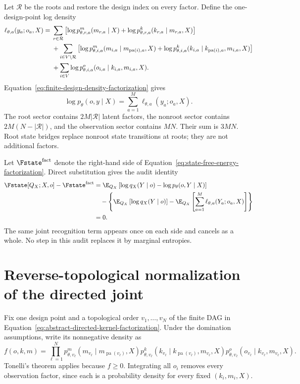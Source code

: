 Let \(\mathcal R\) be the roots and restore the design index on every factor. Define the one-design-point log density
\begin{align}
\ell_{\theta,a}(y_a;o_a,X)
={}&\sum_{r\in\mathcal R}
\left[
\log p_{\theta,r,a}^{m}(m_{r,a}\mid X)
+\log p_{\theta,r,a}^{k}(k_{r,a}\mid m_{r,a},X)
\right]
\label{eq:appendix-one-point-log-factorization}\\
&+\sum_{i\in V\setminus\mathcal R}
\left[
\log p_{\theta,i,a}^{m}
(m_{i,a}\mid m_{\operatorname{pa}(i),a},X)
+\log p_{\theta,i,a}^{k}
(k_{i,a}\mid k_{\operatorname{pa}(i),a},m_{i,a},X)
\right]\notag\\
&+\sum_{i\in V}
\log p_{\theta,i,a}^{o}
(o_{i,a}\mid k_{i,a},m_{i,a},X).\notag
\end{align}
Equation~\eqref{eq:finite-design-density-factorization} gives
\begin{equation}
\log p_\theta(o,y\mid X)
=\sum_{a=1}^{M}\ell_{\theta,a}(y_a;o_a,X).
\label{eq:appendix-finite-design-log-factorization}
\end{equation}
The root sector contains \(2M|\mathcal R|\) latent factors, the nonroot sector contains \(2M(N-|\mathcal R|)\), and the observation sector contains \(MN\). Their sum is \(3MN\). Root state bridges replace nonroot state transitions at roots; they are not additional factors.

Let \(\Fstate^{\mathrm{fact}}\) denote the right-hand side of Equation~\eqref{eq:state-free-energy-factorization}. Direct substitution gives the audit identity
\begin{align}
\Fstate[Q_X;X,o]-\Fstate^{\mathrm{fact}}
&=\E_{Q_X}\left[
\log q_X(Y\mid o)-\log p_\theta(o,Y\mid X)
\right]\notag\\
&\quad-
\left\{
\E_{Q_X}\left[\log q_X(Y\mid o)\right]
-\E_{Q_X}\left[
\sum_{a=1}^{M}\ell_{\theta,a}(Y_a;o_a,X)
\right]
\right\}\notag\\
&=0.
\label{eq:appendix-factorization-zero-residual}
\end{align}
The same joint recognition term appears once on each side and cancels as a whole. No step in this audit replaces it by marginal entropies.

\section{Reverse-topological normalization of the directed joint}
\label{sec:directed-normalization-proof}

Fix one design point and a topological order \(v_1,\ldots,v_N\) of the finite DAG in Equation~\eqref{eq:abstract-directed-kernel-factorization}. Under the domination assumptions, write its nonnegative density as
\begin{equation}
f(o,k,m)
=\prod_{\ell=1}^{N}
p_{\theta,v_\ell}^{m}(m_{v_\ell}\mid m_{\operatorname{pa}(v_\ell)},X)
p_{\theta,v_\ell}^{k}(k_{v_\ell}\mid k_{\operatorname{pa}(v_\ell)},m_{v_\ell},X)
p_{\theta,v_\ell}^{o}(o_{v_\ell}\mid k_{v_\ell},m_{v_\ell},X).
\label{eq:appendix-directed-density}
\end{equation}
Tonelli's theorem applies because \(f\geq0\). Integrating all \(o_i\) removes every observation factor, since each is a probability density for every fixed \((k_i,m_i,X)\).

